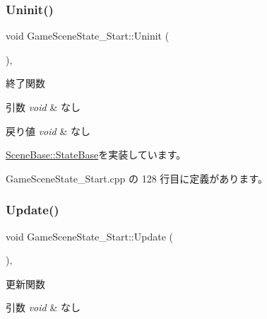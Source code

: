 \subsubsection{\texorpdfstring{Uninit()}{Uninit()}}
{\footnotesize\ttfamily void Game\+Scene\+State\+\_\+\+Start\+::\+Uninit (\begin{DoxyParamCaption}{ }\end{DoxyParamCaption})\hspace{0.3cm}{\ttfamily [override]}, {\ttfamily [virtual]}}



終了関数 


\begin{DoxyParams}{引数}
{\em void} & なし \\
\hline
\end{DoxyParams}

\begin{DoxyRetVals}{戻り値}
{\em void} & なし \\
\hline
\end{DoxyRetVals}


\mbox{\hyperlink{class_scene_base_1_1_state_base_a2763fa37e45b39bd8d3bbb735c76c59b}{Scene\+Base\+::\+State\+Base}}を実装しています。



 Game\+Scene\+State\+\_\+\+Start.\+cpp の 128 行目に定義があります。

\mbox{\label{class_game_scene_state___start_ae11bb8d8ea9eae4fea2a9acf33dd1c8b}} 
\subsubsection{\texorpdfstring{Update()}{Update()}}
{\footnotesize\ttfamily void Game\+Scene\+State\+\_\+\+Start\+::\+Update (\begin{DoxyParamCaption}{ }\end{DoxyParamCaption})\hspace{0.3cm}{\ttfamily [override]}, {\ttfamily [virtual]}}



更新関数 


\begin{DoxyParams}{引数}
{\em void} & なし \\
\hline
\end{DoxyParams}

